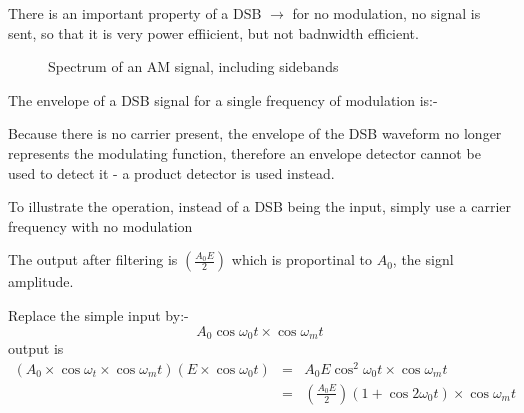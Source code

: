 \documentclass[11pt]{article} %
\begin{document}
There is an important property of a DSB $\rightarrow$ for no modulation, no signal is sent, so that it is very power effiicient, but not badnwidth efficient.

\begin{figure}[h]
		\centering
		\caption{Spectrum of an AM signal, including sidebands}
	\end{figure}


The envelope of a DSB signal for a single frequency of modulation is:-
\begin{figure}[h]
\end{figure}

Because there is no carrier present, the envelope of the DSB waveform no longer represents the modulating function, therefore an envelope detector cannot be used to detect it - a product detector is used instead.

To illustrate the operation, instead of a DSB being the input, simply use a carrier frequency with no modulation



The output after filtering is $\left(\frac{A_0E}{2}\right)$ which is proportinal to $A_0$, the signl amplitude.

Replace the simple input by:-
\begin{equation}
A_0\cos{\omega_0 t} \times \cos{\omega_m t}
\end{equation}
output is
\begin{eqnarray}
(A_0 \times \cos{\omega_t} \times \cos{\omega_m t})(E\times\cos{\omega_0 t})
&=& A_0 E \cos^2{\omega_0 t}\times\cos{\omega_m t} \\
&=& \left(\frac{A_0 E}{2}\right)(1+\cos{2 \omega_0 t}) \times \cos{\omega_m t}
\end{eqnarray}
\end{document}
